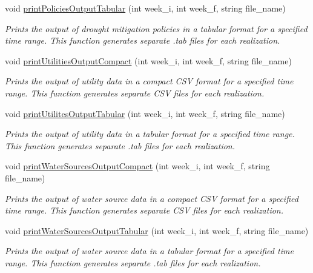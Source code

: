 \begin{DoxyCompactItemize}
void \mbox{\hyperlink{classMasterDataCollector_aa4a08525c6757376edba653a17d6ff60}{print\+Policies\+Output\+Tabular}} (int week\+\_\+i, int week\+\_\+f, string file\+\_\+name)
\begin{DoxyCompactList}\small\item\em Prints the output of drought mitigation policies in a tabular format for a specified time range. This function generates separate {\ttfamily .tab} files for each realization. \end{DoxyCompactList}\item 
void \mbox{\hyperlink{classMasterDataCollector_a7effc4567580a12567a46dd3f195dbac}{print\+Utilities\+Output\+Compact}} (int week\+\_\+i, int week\+\_\+f, string file\+\_\+name)
\begin{DoxyCompactList}\small\item\em Prints the output of utility data in a compact C\+SV format for a specified time range. This function generates separate C\+SV files for each realization. \end{DoxyCompactList}\item 
void \mbox{\hyperlink{classMasterDataCollector_a772bc65951a1170900e89679cc7e0652}{print\+Utilites\+Output\+Tabular}} (int week\+\_\+i, int week\+\_\+f, string file\+\_\+name)
\begin{DoxyCompactList}\small\item\em Prints the output of utility data in a tabular format for a specified time range. This function generates separate {\ttfamily .tab} files for each realization. \end{DoxyCompactList}\item 
void \mbox{\hyperlink{classMasterDataCollector_adbe50e49689078e64a28450087ad0961}{print\+Water\+Sources\+Output\+Compact}} (int week\+\_\+i, int week\+\_\+f, string file\+\_\+name)
\begin{DoxyCompactList}\small\item\em Prints the output of water source data in a compact C\+SV format for a specified time range. This function generates separate C\+SV files for each realization. \end{DoxyCompactList}\item 
void \mbox{\hyperlink{classMasterDataCollector_a77dd707b686d936118cd4e940156754f}{print\+Water\+Sources\+Output\+Tabular}} (int week\+\_\+i, int week\+\_\+f, string file\+\_\+name)
\begin{DoxyCompactList}\small\item\em Prints the output of water source data in a tabular format for a specified time range. This function generates separate {\ttfamily .tab} files for each realization. \end{DoxyCompactList}\item 

\end{DoxyCompactItemize}
